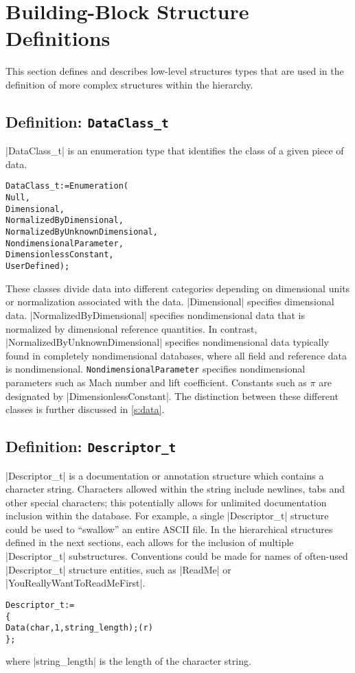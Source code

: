 \section{Building-Block Structure Definitions}
\label{s:build}
\thispagestyle{plain}

This section defines and describes low-level structures types that are
used in the definition of more complex structures within the hierarchy.

\subsection{Definition: \texttt{DataClass\_t}}
\label{s:DataClass}

|DataClass_t| is an enumeration type that identifies the class of a given
piece of data. 
\begin{alltt}
  DataClass\_t := Enumeration( 
    Null, 
    Dimensional,
    NormalizedByDimensional,
    NormalizedByUnknownDimensional,
    NondimensionalParameter,
    DimensionlessConstant,
    UserDefined ) ;
\end{alltt}
These classes divide data into different categories depending on
dimensional units or normalization associated with the data.
|Dimensional| specifies dimensional data.
|NormalizedByDimensional| specifies nondimensional data that is
normalized by dimensional reference quantities.
In contrast, |NormalizedByUnknownDimensional| specifies nondimensional
data typically found in completely nondimensional databases, where all
field and reference data is nondimensional.
\texttt{NondimensionalParameter} specifies nondimensional parameters
such as Mach number and lift coefficient.
Constants such as $\pi$ are designated by |DimensionlessConstant|.
The distinction between these different classes is further discussed
in \autoref{s:data}.

\subsection{Definition: \texttt{Descriptor\_t}}
\label{s:Descriptor}

|Descriptor_t| is a documentation or annotation structure which contains
a character string.
Characters allowed within the string include newlines, tabs and other
special characters; this potentially allows for unlimited documentation
inclusion within the database.
For example, a single |Descriptor_t| structure could be used to ``swallow''
an entire ASCII file.
In the hierarchical structures defined in the next sections, each allows
for the inclusion of multiple |Descriptor_t| substructures.
Conventions could be made for names of often-used |Descriptor_t|
structure entities, such as |ReadMe| or |YouReallyWantToReadMeFirst|.
\begin{alltt}
  Descriptor\_t :=
    \{
    Data(char, 1, string\_length) ;                                          (r)
    \} ;
\end{alltt}
where |string_length| is the length of the character string.

